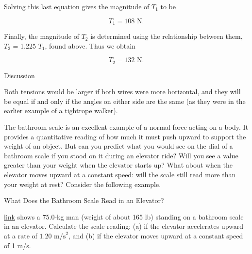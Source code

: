 \documentclass[
]{book}
\begin{document}
Solving this last equation gives the magnitude of
\(T_{1}{}\)\textbf{} to be

\leavevmode{}%
\[{T_{1} = \text{108\ N}}.\]

Finally, the magnitude of \(T_{2}{}\) is determined using the relationship
between them, \(T_{2}{}\) = 1.225 \(T_{1}{}\), found above. Thus we obtain

\leavevmode{}%
\[{T_{2} = \text{132\ N}}.\]

{Discussion}

Both tensions would be larger if both wires were more horizontal, and
they will be equal if and only if the angles on either side are the same
(as they were in the earlier example of a tightrope walker).

The bathroom scale is an excellent example of a normal force acting on a
body. It provides a quantitative reading of how much it must push upward
to support the weight of an object. But can you predict what you would
see on the dial of a bathroom scale if you stood on it during an
elevator ride? Will you see a value greater than your weight when the
elevator starts up? What about when the elevator moves upward at a
constant speed: will the scale still read more than your weight at rest?
Consider the following example.

\hypertarget{fs-id2654282}{}
What Does the Bathroom Scale Read in an Elevator?

\protect\hyperlink{import-auto-id347645}{link} shows a 75.0-kg
man (weight of about 165 lb) standing on a bathroom scale in an
elevator. Calculate the scale reading: (a) if the elevator accelerates
upward at a rate of \({1\text{.}\text{20\ m/s}^{2}}{}\), and (b) if the
elevator moves upward at a constant speed of 1 m/s.
\end{document}
